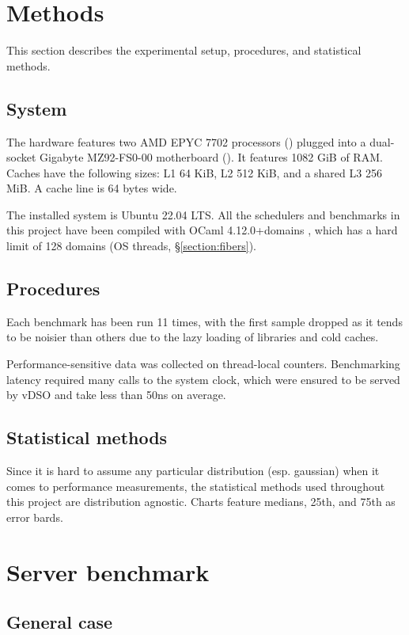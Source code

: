 \documentclass[12pt,a4paper,twoside]{report}
\begin{document}
\section{Methods}
\label{section:methods}
This section describes the experimental setup, procedures, and statistical methods.

\subsection{System}
\label{section:methods_system}
The hardware features two AMD EPYC 7702 processors (\cite{2ndGenAM8:online}) plugged into a dual-socket Gigabyte MZ92-FS0-00 motherboard (\cite{MD90FS0r76:online}). It features 1082 GiB of RAM. Caches have the following sizes: L1 64 KiB, L2 512 KiB, and a shared L3 256 MiB. A cache line is 64 bytes wide. 

The installed system is Ubuntu 22.04 LTS. All the schedulers and benchmarks in this project have been compiled with OCaml 4.12.0+domains \cite{ocamlmul16:online}, which has a hard limit of 128 domains (OS threads, \S\ref{section:fibers}). 

\subsection{Procedures}
Each benchmark has been run 11 times, with the first sample dropped as it tends to be noisier than others due to the lazy loading of libraries and cold caches. 

Performance-sensitive data was collected on thread-local counters. Benchmarking latency required many calls to the system clock, which were ensured to be served by vDSO \cite{vdso7Lin5:online} and take less than 50ns on average. 

\subsection{Statistical methods}
Since it is hard to assume any particular distribution (esp. gaussian) when it comes to performance measurements, the statistical methods used throughout this project are distribution agnostic. Charts feature medians, 25th, and 75th as error bards.


\section{Server benchmark} 
\label{section:server_benchmark}

\subsection{General case}
\label{section:benchmark-general-case}
\end{document}

